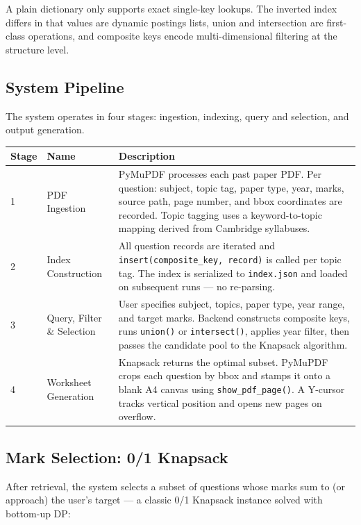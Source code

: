 \documentclass[10pt]{article}
\begin{document}
A plain dictionary only supports exact single-key lookups. The inverted index differs in that values are dynamic postings lists, union and intersection are first-class operations, and composite keys encode multi-dimensional filtering at the structure level.

\subsection*{System Pipeline}
The system operates in four stages: ingestion, indexing, query and selection, and output generation.

\vspace{6pt}
\begin{tabularx}{\textwidth}{@{} C{1.1cm} L{2.8cm} X @{}}
  \toprule
  \textbf{Stage} & \textbf{Name} & \textbf{Description} \\
   & PDF Ingestion &
    PyMuPDF processes each past paper PDF. Per question: subject, topic tag, paper type, year, marks, source path, page number, and bbox coordinates are recorded. Topic tagging uses a keyword-to-topic mapping derived from Cambridge syllabuses. \\[4pt]
  2 & Index Construction &
    All question records are iterated and \texttt{insert(composite\_key, record)} is called per topic tag. The index is serialized to \texttt{index.json} and loaded on subsequent runs --- no re-parsing. \\[4pt]
  3 & Query, Filter \& Selection &
    User specifies subject, topics, paper type, year range, and target marks. Backend constructs composite keys, runs \texttt{union()} or \texttt{intersect()}, applies year filter, then passes the candidate pool to the Knapsack algorithm. \\[4pt]
  4 & Worksheet Generation &
    Knapsack returns the optimal subset. PyMuPDF crops each question by bbox and stamps it onto a blank A4 canvas using \texttt{show\_pdf\_page()}. A Y-cursor tracks vertical position and opens new pages on overflow. \\
  \bottomrule
\end{tabularx}
\vspace{6pt}

\subsection*{Mark Selection: 0/1 Knapsack}
After retrieval, the system selects a subset of questions whose marks sum to (or approach) the user's target --- a classic 0/1 Knapsack instance solved with bottom-up DP:
\end{document}
